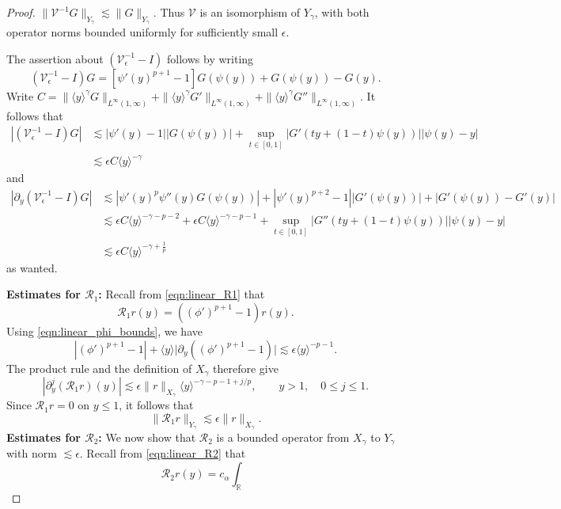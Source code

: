 \documentclass[11pt]{amsart}
\theoremstyle{definition}
\theoremstyle{remark}
\numberwithin{equation}{section}
\newcommand{\R}{\mathbb{R}}
\newcommand{\mc}[1]{\mathcal{#1}}
\newcommand{\ang}[1]{\langle #1 \rangle}
\begin{document}
\begin{proof}
    $\|\mc{V}^{-1}G\|_{Y_\gamma}\lesssim\|G\|_{Y_\gamma}$.
    Thus $\mc{V}$ is an isomorphism of $Y_\gamma$, with both operator
    norms bounded uniformly for sufficiently small $\epsilon$. \par
    The assertion about $(\mc{V}_\epsilon^{-1} - I)$ follows by writing 
    \[(\mc{V}_\epsilon^{-1} - I)G = [\psi'(y)^{p + 1} - 1]G(\psi(y)) + G(\psi(y)) - G(y).\]
    Write $C = \|\ang{y}^{\gamma}G\|_{L^\infty(1, \infty)} + \|\ang{y}^{\gamma}G'\|_{L^\infty(1, \infty)} + \|\ang{y}^{\gamma}G''\|_{L^\infty(1, \infty)}$.
    It follows that 
    \begin{align*}
        |(\mc{V}_\epsilon^{-1} - I)G| & \lesssim |\psi'(y) - 1||G(\psi(y))| + \sup_{t \in [0,1]}|G'(ty + (1-t)\psi(y))||\psi(y) - y| \\
        & \lesssim \epsilon C\ang{y}^{-\gamma}
    \end{align*}
    and 
    \begin{align*}
        |\partial_y(\mc{V}_\epsilon^{-1} - I)G| & \lesssim |\psi'(y)^{p} \psi''(y)G(\psi(y))| + |\psi'(y)^{p+2}-1||G'(\psi(y))| + |G'(\psi(y)) - G'(y)| \\
        & \lesssim \epsilon C\ang{y}^{-\gamma-p - 2} + \epsilon C\ang{y}^{-\gamma-p - 1} + \sup_{t \in [0,1]}|G''(ty + (1-t)\psi(y))||\psi(y) - y| \\
        & \lesssim \epsilon C \ang{y}^{-\gamma + \frac{1}{p}}
    \end{align*}
    as wanted. \par
    \textbf{Estimates for $\mc{R}_1$:} Recall from \eqref{eqn:linear_R1} that 
    \[\mc{R}_1r(y) = \left((\phi')^{p + 1} - 1\right)r(y).\]
    Using \eqref{eqn:linear_phi_bounds}, we have
    \[
        |(\phi')^{p+1}-1|
        +\ang{y}\bigl|\partial_y((\phi')^{p+1}-1)\bigr|
        \lesssim\epsilon\ang{y}^{-p-1}.
    \]
    The product rule and the definition of $X_\gamma$ therefore give
    \[
        |\partial_y^j(\mc{R}_1r)(y)|
        \lesssim\epsilon\|r\|_{X_\gamma}
        \ang{y}^{-\gamma-p-1+j/p},
        \qquad y>1,\quad 0\le j\le1.
    \]
    Since $\mc{R}_1r=0$ on $y\le1$, it follows that
    \begin{equation}\label{eqn:linear_R1_bound}
        \|\mc{R}_1r\|_{Y_\gamma}
        \lesssim\epsilon\|r\|_{X_\gamma}.
    \end{equation}
\textbf{Estimates for $\mc{R}_2$:} We now show that $\mc{R}_2$ is a bounded operator from $X_\gamma$ to $Y_\gamma$ with norm $\lesssim \epsilon$. Recall from \eqref{eqn:linear_R2} that
\[\mc{R}_2r(y) = c_\alpha\int_{\R}
\]
\end{proof}
\end{document}
